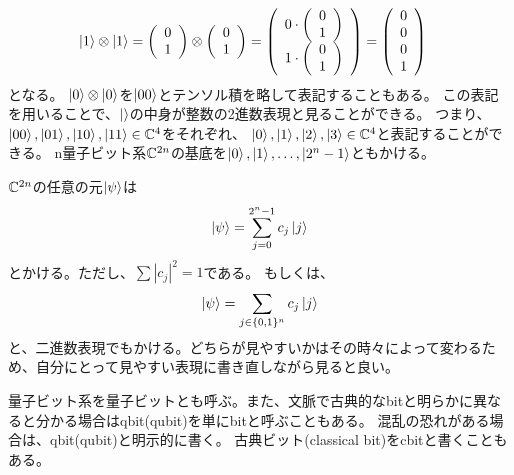 \begin{align} %
  \ket{1}\otimes\ket{1} &=
  \left(
    \begin{array}{c}
      0\\
      1
    \end{array}
  \right)
  \otimes
  \left(
    \begin{array}{c}
      0\\
      1
    \end{array}
  \right)
  =
  \left(
  \begin{array}{c}
    0 \cdot \left(
              \begin{array}{c}
                0\\
                1
              \end{array}
            \right)\\
    1 \cdot \left(
              \begin{array}{c}
                0\\
                1
              \end{array}
            \right)\\
    \end{array}
  \right)
  =
  \left(
    \begin{array}{c}
      0\\
      0\\
      0\\
      1
    \end{array}
  \right)
\end{align}
となる。
$\ket{0}\otimes\ket{0}$を$\ket{00}$とテンソル積を略して表記することもある。
この表記を用いることで、$\ket{}$の中身が整数の2進数表現と見ることができる。
つまり、$\ket{00},\ket{01},\ket{10},\ket{11}\in\mathbb{C}^4$をそれぞれ、
$\ket{0},\ket{1},\ket{2},\ket{3}\in\mathbb{C}^4$と表記することができる。
n量子ビット系$\mathbb{C}^{2n}$の基底を$\ket{0},\ket{1},\ldots,\ket{2^n-1}$ともかける。

$\mathbb{C}^{2n}$の任意の元$\ket{\psi}$は
\begin{equation}
  \ket{\psi} = \sum_{j=0}^{2^n-1} c_j \ket{j}
\end{equation}
とかける。ただし、$\sum|c_j|^2 = 1$である。
もしくは、
\begin{equation}
  \ket{\psi} = \sum_{j\in\{0,1\}^n} c_j \ket{j}
\end{equation}
と、二進数表現でもかける。どちらが見やすいかはその時々によって変わるため、自分にとって見やすい表現に書き直しながら見ると良い。

量子ビット系を量子ビットとも呼ぶ。また、文脈で古典的なbitと明らかに異なると分かる場合はqbit(qubit)を単にbitと呼ぶこともある。
混乱の恐れがある場合は、qbit(qubit)と明示的に書く。
古典ビット(classical bit)をcbitと書くこともある。
